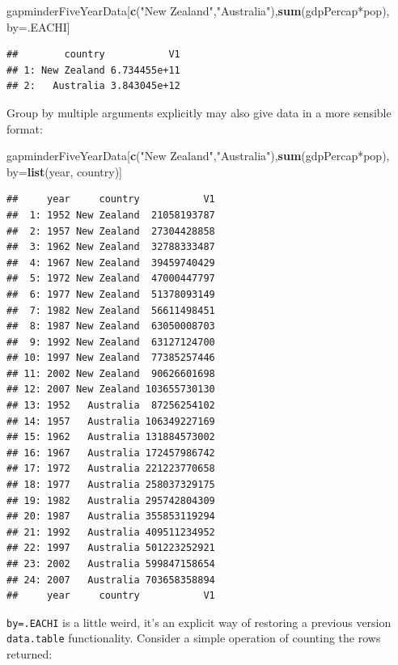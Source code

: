 \documentclass[]{article}
\newenvironment{Shaded}{\begin{snugshade}}{\end{snugshade}}
\newcommand{\KeywordTok}[1]{\textcolor[rgb]{0.13,0.29,0.53}{\textbf{{#1}}}}
\newcommand{\StringTok}[1]{\textcolor[rgb]{0.31,0.60,0.02}{{#1}}}
\newcommand{\NormalTok}[1]{{#1}}
\begin{document}
\begin{Shaded}
\begin{Highlighting}[]
\NormalTok{gapminderFiveYearData[}\KeywordTok{c}\NormalTok{(}\StringTok{"New Zealand"}\NormalTok{,}\StringTok{"Australia"}\NormalTok{),}\KeywordTok{sum}\NormalTok{(gdpPercap*pop), by=.EACHI]}
\end{Highlighting}
\end{Shaded}

\begin{verbatim}
##        country           V1
## 1: New Zealand 6.734455e+11
## 2:   Australia 3.843045e+12
\end{verbatim}

Group by multiple arguments explicitly may also give data in a more
sensible format:

\begin{Shaded}
\begin{Highlighting}[]
\NormalTok{gapminderFiveYearData[}\KeywordTok{c}\NormalTok{(}\StringTok{"New Zealand"}\NormalTok{,}\StringTok{"Australia"}\NormalTok{),}\KeywordTok{sum}\NormalTok{(gdpPercap*pop), by=}\KeywordTok{list}\NormalTok{(year, country)]}
\end{Highlighting}
\end{Shaded}

\begin{verbatim}
##     year     country           V1
##  1: 1952 New Zealand  21058193787
##  2: 1957 New Zealand  27304428858
##  3: 1962 New Zealand  32788333487
##  4: 1967 New Zealand  39459740429
##  5: 1972 New Zealand  47000447797
##  6: 1977 New Zealand  51378093149
##  7: 1982 New Zealand  56611498451
##  8: 1987 New Zealand  63050008703
##  9: 1992 New Zealand  63127124700
## 10: 1997 New Zealand  77385257446
## 11: 2002 New Zealand  90626601698
## 12: 2007 New Zealand 103655730130
## 13: 1952   Australia  87256254102
## 14: 1957   Australia 106349227169
## 15: 1962   Australia 131884573002
## 16: 1967   Australia 172457986742
## 17: 1972   Australia 221223770658
## 18: 1977   Australia 258037329175
## 19: 1982   Australia 295742804309
## 20: 1987   Australia 355853119294
## 21: 1992   Australia 409511234952
## 22: 1997   Australia 501223252921
## 23: 2002   Australia 599847158654
## 24: 2007   Australia 703658358894
##     year     country           V1
\end{verbatim}

\texttt{by=.EACHI} is a little weird, it's an explicit way of restoring
a previous version \texttt{data.table} functionality. Consider a simple
operation of counting the rows returned:
\end{document}
